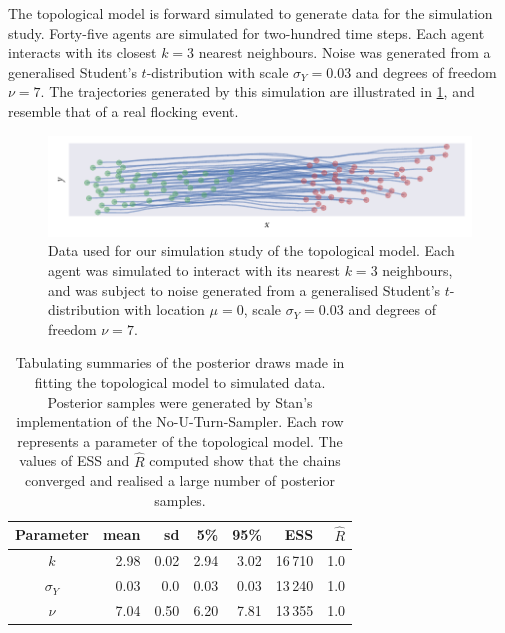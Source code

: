 The topological model is forward simulated to generate data for the simulation
study. Forty-five agents are simulated for two-hundred time steps. Each agent
interacts with its closest $k=3$ nearest neighbours. Noise was generated from a
generalised Student's $t$-distribution with scale $\sigma_Y=0.03$ and degrees
of freedom $\nu=7$. The trajectories generated by this simulation are
illustrated in \cref{fig:top_sim}, and resemble that of a real flocking event.

\begin{figure}[tbp]
  \includegraphics{top/top_sim.pdf}
  \caption{Data used for our simulation study of the topological model. Each
    agent was simulated to interact with its nearest $k=3$ neighbours, and was
    subject to noise generated from a generalised Student's $t$-distribution
    with location $\mu=0$, scale $\sigma_Y=0.03$ and degrees of freedom $\nu=7$.}
  \label{fig:top_sim}
\end{figure}
\begin{table}[tbp]
  \begin{tabular}{@{}crrrrrr@{}}
    \toprule
    Parameter    & mean & sd   & 5\%  & 95\% & ESS     & $\widehat{R}$ \\
    \midrule
    $k$          & 2.98 & 0.02 & 2.94 & 3.02 & 16\,710 & 1.0           \\
    $\sigma_{Y}$ & 0.03 & 0.0  & 0.03 & 0.03 & 13\,240 & 1.0           \\
    $\nu$        & 7.04 & 0.50 & 6.20 & 7.81 & 13\,355 & 1.0           \\
    \bottomrule
  \end{tabular}
  \caption{Tabulating summaries of the posterior draws made in fitting the
    topological model to simulated data. Posterior samples were generated by
    Stan's implementation of the No-U-Turn-Sampler. Each row represents a
    parameter of the topological model. The values of ESS and $\widehat{R}$
    computed show that the chains converged and realised a large number of
    posterior samples.}
  \label{tab:top_summary}
\end{table}
